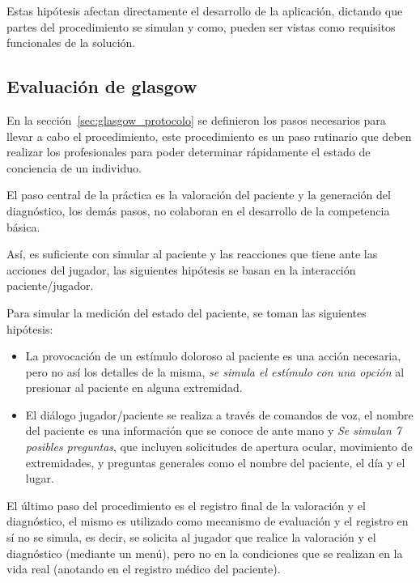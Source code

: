 Estas hipótesis afectan directamente el desarrollo de la aplicación, dictando
que partes del procedimiento se simulan y como, pueden ser vistas como
requisitos funcionales de la solución.

\subsection{Evaluación de glasgow}
\label{sec:glasgow_hipotesis}

En la sección~\ref{sec:glasgow_protocolo} se definieron los pasos necesarios
para llevar a cabo el procedimiento, este procedimiento es un paso rutinario que
deben realizar los profesionales para poder determinar rápidamente el estado de
conciencia de un individuo. 

El paso central de la práctica es la valoración del paciente y la generación del
diagnóstico, los demás pasos, no colaboran en el desarrollo de la competencia
básica.

Así, es suficiente con simular al paciente y las reacciones que tiene ante las
acciones del jugador, las siguientes hipótesis se basan en la interacción
paciente/jugador.

Para simular la medición del estado del paciente, se toman las siguientes
hipótesis:

\begin{itemize}
    \item La provocación de un estímulo doloroso al paciente es una acción
        necesaria, pero no así los detalles de la misma, \emph{se simula el
            estímulo con una opción} al presionar al paciente en alguna
        extremidad.
    \item El diálogo jugador/paciente se realiza a través de comandos de voz, el
        nombre del paciente es una información que se conoce de ante mano y
        \emph{Se simulan 7 posibles preguntas}, que incluyen solicitudes de
        apertura ocular, movimiento de extremidades, y preguntas generales como
        el nombre del paciente, el día y el lugar.
\end{itemize}

El último paso del procedimiento es el registro final de la valoración y el
diagnóstico, el mismo es utilizado como mecanismo de evaluación y el registro en
sí no se simula, es decir, se solicita al jugador que realice la valoración y el
diagnóstico (mediante un menú), pero no en la condiciones que se realizan en la
vida real (anotando en el registro médico del paciente).

